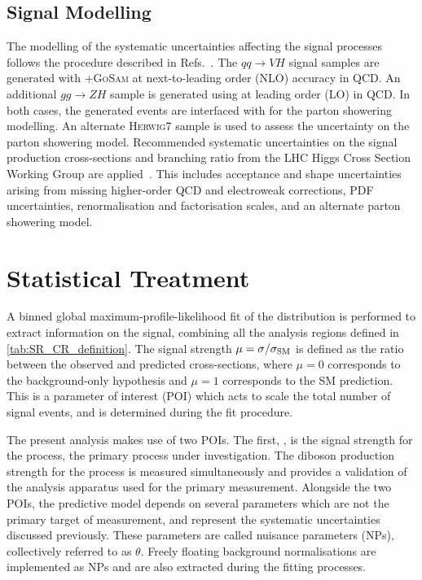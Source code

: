 \subsection{Signal Modelling}

The modelling of the systematic uncertainties affecting the signal processes follows the procedure described in Refs.~\cite{HIGG-2018-50,deFlorian:2016spz,HIGG-2016-29}.
The $qq \rightarrow VH$ signal samples are generated with \POWHEGBOX[v2]+\textsc{GoSam} at next-to-leading order (NLO) accuracy in QCD. 
An additional $gg \rightarrow ZH$ sample is generated using \POWHEGBOX[v2] at leading order (LO) in QCD.
In both cases, the generated events are interfaced with  for the parton showering modelling.
An alternate \textsc{Herwig7} sample is used to assess the uncertainty on the parton showering model.
Recommended systematic uncertainties on the signal production cross-sections and \Hbb branching ratio from the LHC Higgs Cross Section Working Group are applied~\cite{Dittmaier:2012vm,Heinemeyer:2013tqa}.
This includes acceptance and shape uncertainties arising from missing higher-order QCD and electroweak corrections, PDF uncertainties, renormalisation and factorisation scales, and an alternate parton showering model.

\section{Statistical Treatment}\label{sec:vhbb_fit}

A binned global maximum-profile-likelihood fit of the \mJ distribution is performed to extract information on the signal, combining all the analysis regions defined in \cref{tab:SR_CR_definition}.
The signal strength $\mu = \sigma / \sigma_{\textnormal{SM}}$ is defined as the ratio between the observed and predicted cross-sections, where $\mu = 0$ corresponds to the background-only hypothesis and $\mu = 1$ corresponds to the SM prediction.
This is a parameter of interest (POI) which acts to scale the total number of signal events, and is determined during the fit procedure.

The present analysis makes use of two POIs.
The first, \muVH, is the signal strength for the \VHbb process, the primary process under investigation.
The diboson production strength \muVZ for the \VZbb process is measured simultaneously and provides a validation of the analysis apparatus used for the primary \Hbb measurement.
Alongside the two POIs, the predictive model depends on several parameters which are not the primary target of measurement, and represent the systematic uncertainties discussed previously.
These parameters are called nuisance parameters (NPs), collectively referred to as $\theta$.
Freely floating background normalisations are implemented as NPs and are also extracted during the fitting processes.


